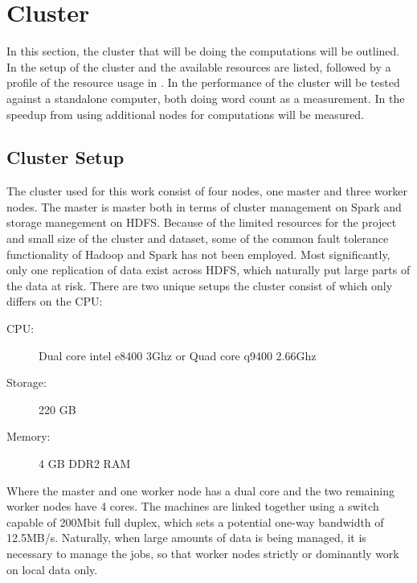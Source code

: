 \section{Cluster}\label{sec:cluster}
In this section, the cluster that will be doing the computations will be outlined. In  the setup of the cluster and the available resources are listed, followed by a profile of the resource usage in . In  the performance of the cluster will be tested against a standalone computer, both doing word count as a measurement. In  the speedup from using additional nodes for computations will be measured.

\subsection{Cluster Setup}\label{sec:clustersetup}

The cluster used for this work consist of four nodes, one master and three worker nodes. The master is master both in terms of cluster management on Spark and storage manegement on HDFS. Because of the limited resources for the project and small size of the cluster and dataset, some of the common fault tolerance functionality of Hadoop and Spark has not been employed. Most significantly, only one replication of data exist across HDFS, which naturally put large parts of the data at risk. There are two unique setups the cluster consist of which only differs on the CPU:\@
\begin{description}
\item[CPU:] Dual core intel e8400 3Ghz or Quad core q9400 2.66Ghz
\item[Storage:] 220 GB
\item[Memory:] 4 GB DDR2 RAM
\end{description}

Where the master and one worker node has a dual core and the two remaining worker nodes have 4 cores. The machines are linked together using a switch capable of 200Mbit full duplex, which sets a potential one-way bandwidth of 12.5MB/s. Naturally, when large amounts of data is being managed, it is necessary to manage the jobs, so that worker nodes strictly or dominantly work on local data only.

